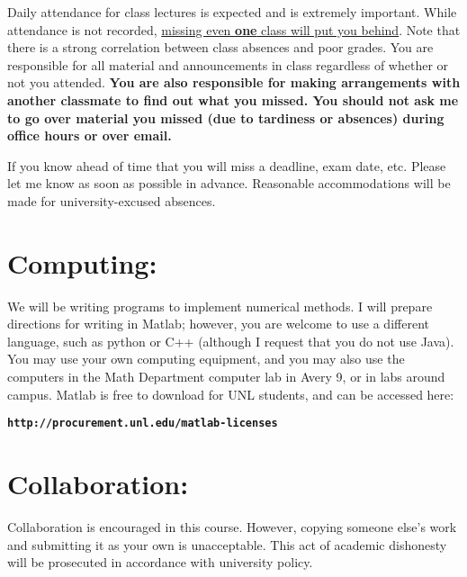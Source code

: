 \documentclass[margin]{res}
\theoremstyle{plain}
\theoremstyle{definition}
\theoremstyle{remark}
\begin{document}
\begin{resume}
Daily attendance for class lectures is expected and is extremely important. 
While attendance is not recorded, \underline{missing even \textbf{one} class will put you behind}. Note that there is a strong correlation between class absences and poor grades.   You are responsible for all material and announcements in class regardless of whether or not you attended.  \textbf{You are also responsible for making arrangements with another classmate to find out what you missed.  You should not ask me to go over material you missed (due to tardiness or absences) during office hours or over email.} 

If you know ahead of time that you will miss a deadline, exam date, etc. Please let me know as soon as possible in advance. Reasonable accommodations will be made for university-excused absences.


\section{Computing:}
We will be writing programs to implement numerical methods. I will prepare directions for writing in
Matlab; however, you are welcome to use a different language, such as python or C++ (although I request that you do not use Java). You may use your own computing equipment, and you may also use the computers in the Math Department computer lab in Avery 9, or in labs around campus.  Matlab is free to download for UNL students, and can be accessed here:

\texttt{\textbf{http://procurement.unl.edu/matlab-licenses}}

\section{Collaboration:} Collaboration is encouraged in this course. However, copying someone else's work and submitting it as your own is unacceptable.  This act of academic dishonesty will be prosecuted in accordance with university policy.


\end{resume}
\end{document}
